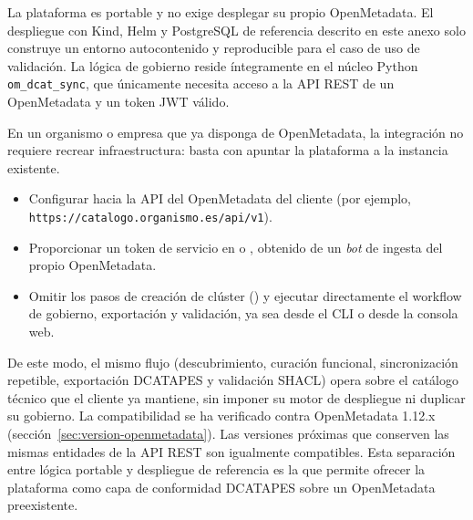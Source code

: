 La plataforma es portable y no exige desplegar su propio OpenMetadata. El despliegue con Kind, Helm y PostgreSQL de referencia descrito en este anexo solo construye un entorno autocontenido y reproducible para el caso de uso de validación. La lógica de gobierno reside íntegramente en el núcleo Python \texttt{om\_dcat\_sync}, que únicamente necesita acceso a la \ac{API} \ac{REST} de un OpenMetadata y un token \ac{JWT} válido.

En un organismo o empresa que ya disponga de OpenMetadata, la integración no requiere recrear infraestructura: basta con apuntar la plataforma a la instancia existente.

\begin{itemize}
    \item Configurar  hacia la \ac{API} del OpenMetadata del cliente (por ejemplo, \texttt{https://catalogo.organismo.es/api/v1}).
    \item Proporcionar un token de servicio en  o , obtenido de un \emph{bot} de ingesta del propio OpenMetadata.
    \item Omitir los pasos de creación de clúster () y ejecutar directamente el workflow de gobierno, exportación y validación, ya sea desde el \ac{CLI} o desde la consola web.
\end{itemize}

De este modo, el mismo flujo (descubrimiento, curación funcional, sincronización repetible, exportación \ac{DCATAPES} y validación \ac{SHACL}) opera sobre el catálogo técnico que el cliente ya mantiene, sin imponer su motor de despliegue ni duplicar su gobierno. La compatibilidad se ha verificado contra OpenMetadata 1.12.x (sección~\ref{sec:version-openmetadata}). Las versiones próximas que conserven las mismas entidades de la \ac{API} \ac{REST} son igualmente compatibles. Esta separación entre lógica portable y despliegue de referencia es la que permite ofrecer la plataforma como capa de conformidad \ac{DCATAPES} sobre un OpenMetadata preexistente.
